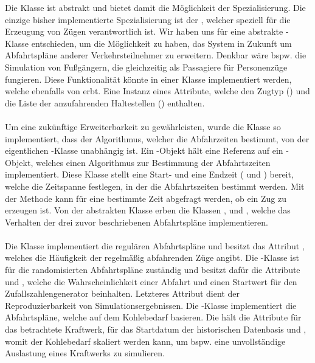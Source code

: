 Die Klasse  ist abstrakt und bietet damit die Möglichkeit der Spezialisierung. Die einzige bisher implementierte Spezialisierung ist der , welcher speziell für die Erzeugung von Zügen verantwortlich ist. Wir haben uns für eine abstrakte -Klasse entschieden, um die Möglichkeit zu haben, das System in Zukunft um Abfahrtspläne anderer Verkehrsteilnehmer zu erweitern. Denkbar wäre bspw. die Simulation von Fußgängern, die gleichzeitig als Passagiere für Personenzüge fungieren. Diese Funktionalität könnte in einer Klasse  implementiert werden, welche ebenfalls von  erbt. Eine Instanz eines  Attribute, welche den Zugtyp () und die Liste der anzufahrenden Haltestellen () enthalten.\\
\\
Um eine zukünftige Erweiterbarkeit zu gewährleisten, wurde die Klasse  so implementiert, dass der Algorithmus, welcher die Abfahrzeiten bestimmt, von der eigentlichen -Klasse unabhängig ist. Ein -Objekt hält eine Referenz auf ein -Objekt, welches einen Algorithmus zur Bestimmung der Abfahrtszeiten implementiert. Diese Klasse stellt eine Start- und eine Endzeit ( und ) bereit, welche die Zeitspanne festlegen, in der die Abfahrtszeiten bestimmt werden. Mit der Methode  kann für eine bestimmte Zeit abgefragt werden, ob ein Zug zu erzeugen ist. Von der abstrakten Klasse  erben die Klassen ,  und , welche das Verhalten der drei zuvor beschriebenen Abfahrtspläne implementieren.\\
\\
Die Klasse  implementiert die regulären Abfahrtspläne und besitzt das Attribut , welches die Häufigkeit der regelmäßig abfahrenden Züge angibt. Die -Klasse ist für die randomisierten Abfahrtspläne zuständig und besitzt dafür die Attribute  und , welche die Wahrscheinlichkeit einer Abfahrt und einen Startwert für den Zufallszahlengenerator beinhalten. Letzteres Attribut dient der Reproduzierbarkeit von Simulationsergebnissen. Die -Klasse implementiert die Abfahrtspläne, welche auf dem Kohlebedarf basieren. Die hält die Attribute  für das betrachtete Kraftwerk,  für das Startdatum der historischen Datenbasis und , womit der Kohlebedarf skaliert werden kann, um bspw. eine unvollständige Auslastung eines Kraftwerks zu simulieren.

